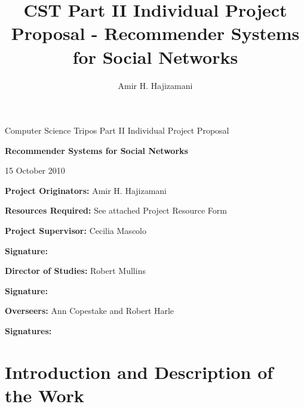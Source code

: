 
\author{Amir H. Hajizamani}
\title{CST Part II Individual Project Proposal - Recommender Systems for Social Networks}

\newcommand{\al}{$<$}
\newcommand{\ar}{$>$}

\parindent 0pt
\parskip 6pt

\thispagestyle{empty}

\medskip
{}
\medskip
{}

\vfill

\centerline{\large Computer Science Tripos Part II Individual Project Proposal}
\vspace{0.4in}
\centerline{\Large\bf Recommender Systems for Social Networks}
\vspace{0.3in}
\centerline{\large{15 October 2010}}

\vfill

{\bf Project Originators:} Amir H. Hajizamani

\vspace{0.1in}

{\bf Resources Required:} See attached Project Resource Form

\vspace{0.5in}

{\bf Project Supervisor:} Cecilia Mascolo

\vspace{0.2in}

{\bf Signature:}

\vspace{0.5in}

{\bf Director of Studies:} Robert Mullins

\vspace{0.2in}

{\bf Signature:}

\vspace{0.5in}

{\bf Overseers:} Ann Copestake and Robert Harle

\vspace{0.2in}

{\bf Signatures:}

\vfill
\eject


\section{Introduction and Description of the Work}

